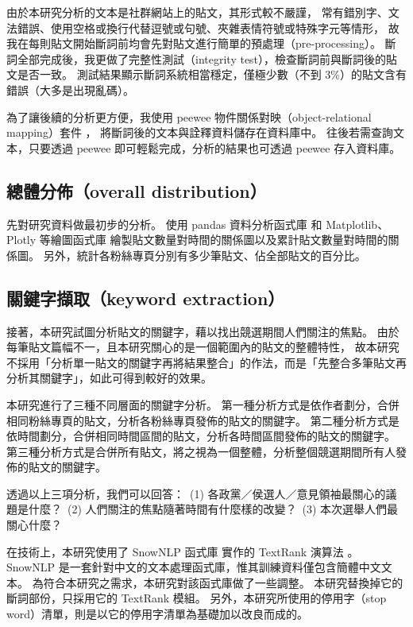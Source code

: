 \documentclass[a4paper, 10pt, conference]{ieeeconf}       %
\begin{document}
\begin{CJK}{UTF8}{bsmi}
由於本研究分析的文本是社群網站上的貼文，其形式較不嚴謹，%
常有錯別字、文法錯誤、使用空格或換行代替逗號或句號、夾雜表情符號或特殊字元等情形，%
故我在每則貼文開始斷詞前均會先對貼文進行簡單的預處理（pre-processing）。%
斷詞全部完成後，我更做了完整性測試（integrity test），檢查斷詞前與斷詞後的貼文是否一致。%
測試結果顯示斷詞系統相當穩定，僅極少數（不到 3\%）的貼文含有錯誤（大多是出現亂碼）。%

為了讓後續的分析更方便，我使用 peewee 物件關係對映（object-relational mapping）套件 \cite{c8}，%
將斷詞後的文本與詮釋資料儲存在資料庫中。%
往後若需查詢文本，只要透過 peewee 即可輕鬆完成，分析的結果也可透過 peewee 存入資料庫。%

\subsection*{總體分佈（overall distribution）}

先對研究資料做最初步的分析。%
使用 pandas 資料分析函式庫 \cite{c9} 和 Matplotlib、Plotly 等繪圖函式庫 \cite{c10, c16} %
繪製貼文數量對時間的關係圖以及累計貼文數量對時間的關係圖。%
另外，統計各粉絲專頁分別有多少筆貼文、佔全部貼文的百分比。%

\subsection*{關鍵字擷取（keyword extraction）}

接著，本研究試圖分析貼文的關鍵字，藉以找出競選期間人們關注的焦點。%
由於每筆貼文篇幅不一，且本研究關心的是一個範圍內的貼文的整體特性，%
故本研究不採用「分析單一貼文的關鍵字再將結果整合」的作法，而是「先整合多筆貼文再分析其關鍵字」，如此可得到較好的效果。%

本研究進行了三種不同層面的關鍵字分析。%
第一種分析方式是依作者劃分，合併相同粉絲專頁的貼文，分析各粉絲專頁發佈的貼文的關鍵字。%
第二種分析方式是依時間劃分，合併相同時間區間的貼文，分析各時間區間發佈的貼文的關鍵字。%
第三種分析方式是合併所有貼文，將之視為一個整體，分析整個競選期間所有人發佈的貼文的關鍵字。%

透過以上三項分析，我們可以回答：%
\,(1) 各政黨／侯選人／意見領袖最關心的議題是什麼？%
\,(2) 人們關注的焦點隨著時間有什麼樣的改變？%
\,(3) 本次選舉人們最關心什麼？%

在技術上，本研究使用了 SnowNLP 函式庫 \cite{c11} 實作的 TextRank 演算法 \cite{c12}。%
SnowNLP 是一套針對中文的文本處理函式庫，惟其訓練資料僅包含簡體中文文本。%
為符合本研究之需求，本研究對該函式庫做了一些調整。%
本研究替換掉它的斷詞部份，只採用它的 TextRank 模組。%
另外，本研究所使用的停用字（stop word）清單，則是以它的停用字清單為基礎加以改良而成的。%


\end{CJK}
\end{document}
